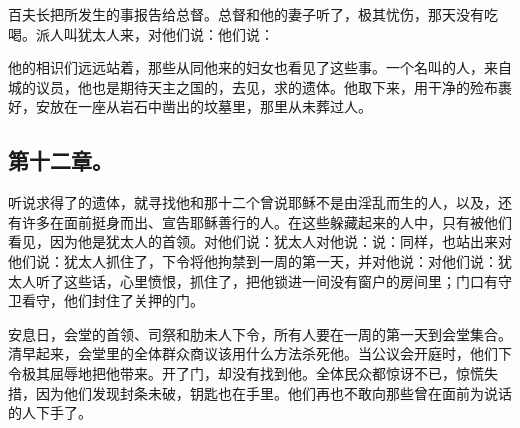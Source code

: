 百夫长把所发生的事报告给总督。总督和他的妻子听了，极其忧伤，那天没有吃喝。派人叫犹太人来，对他们说：他们说：\par

他的相识们远远站着，那些从同他来的妇女也看见了这些事。一个名叫的人，来自城的议员，他也是期待天主之国的，去见，求的遗体。他取下来，用干净的殓布裹好，安放在一座从岩石中凿出的坟墓里，那里从未葬过人。\par


\subsection{第十二章。}

听说求得了的遗体，就寻找他和那十二个曾说耶稣不是由淫乱而生的人，以及，还有许多在面前挺身而出、宣告耶稣善行的人。在这些躲藏起来的人中，只有被他们看见，因为他是犹太人的首领。对他们说：犹太人对他说：说：同样，也站出来对他们说：犹太人抓住了，下令将他拘禁到一周的第一天，并对他说：对他们说：犹太人听了这些话，心里愤恨，抓住了，把他锁进一间没有窗户的房间里；门口有守卫看守，他们封住了关押的门。\par

安息日，会堂的首领、司祭和肋未人下令，所有人要在一周的第一天到会堂集合。清早起来，会堂里的全体群众商议该用什么方法杀死他。当公议会开庭时，他们下令极其屈辱地把他带来。开了门，却没有找到他。全体民众都惊讶不已，惊慌失措，因为他们发现封条未破，钥匙也在手里。他们再也不敢向那些曾在面前为说话的人下手了。\par


